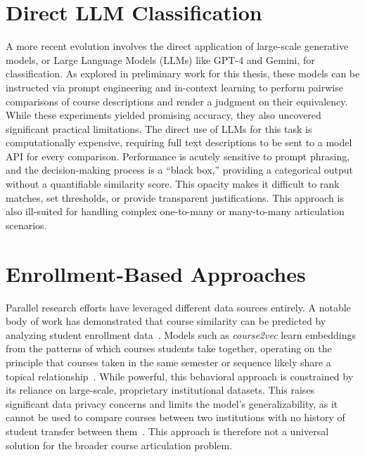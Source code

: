 \section{Direct LLM Classification}\label{ch:2.4}
A more recent evolution involves the direct application of large-scale generative models, or Large Language Models (LLMs) like GPT-4 and Gemini, for classification. As explored in preliminary work for this thesis, these models can be instructed via prompt engineering and in-context learning to perform pairwise comparisons of course descriptions and render a judgment on their equivalency. While these experiments yielded promising accuracy, they also uncovered significant practical limitations. The direct use of LLMs for this task is computationally expensive, requiring full text descriptions to be sent to a model API for every comparison. Performance is acutely sensitive to prompt phrasing, and the decision-making process is a ``black box,'' providing a categorical output without a quantifiable similarity score. This opacity makes it difficult to rank matches, set thresholds, or provide transparent justifications. This approach is also ill-suited for handling complex one-to-many or many-to-many articulation scenarios.

\section{Enrollment-Based Approaches}\label{ch:2.5}
Parallel research efforts have leveraged different data sources entirely. A notable body of work has demonstrated that course similarity can be predicted by analyzing student enrollment data~\cite{pardos2018connectionistrecommendationwildutility, JiangPardosMulti2VecEDM2020}. Models such as \emph{course2vec} learn embeddings from the patterns of which courses students take together, operating on the principle that courses taken in the same semester or sequence likely share a topical relationship~\cite{pardos2018connectionistrecommendationwildutility}. While powerful, this behavioral approach is constrained by its reliance on large-scale, proprietary institutional datasets. This raises significant data privacy concerns and limits the model's generalizability, as it cannot be used to compare courses between two institutions with no history of student transfer between them~\cite{slade10.1177/0002764213479366}. This approach is therefore not a universal solution for the broader course articulation problem.

